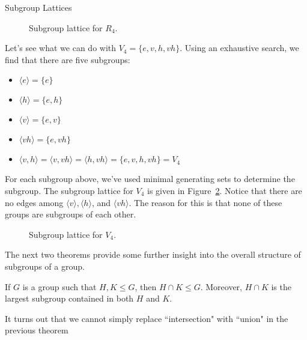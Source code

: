 \begin{section}{Subgroup Lattices}
\begin{figure}[!ht]
\caption{Subgroup lattice for $R_4$.}
\label{fig:latticeR4}
\end{figure}

Let's see what we can do with $V_4=\{e,v,h,vh\}$.  Using an exhaustive search, we find that there are five subgroups:
\begin{itemize}
\item[] $\langle e \rangle = \{e\}$
\item[] $\langle h \rangle  = \{e,h\}$
\item[] $\langle v \rangle  = \{e,v\}$
\item[] $\langle vh \rangle  = \{e,vh\}$
\item[] $\langle v,h \rangle = \langle v,vh\rangle = \langle h, vh\rangle= \{e,v,h,vh\}=V_4$
\end{itemize}
For each subgroup above, we've used minimal generating sets to determine the subgroup.  The subgroup lattice for $V_4$ is given in Figure~\ref{fig:latticeV4}. Notice that there are no edges among $\langle v\rangle, \langle h\rangle$, and $\langle vh\rangle$.  The reason for this is that none of these groups are subgroups of each other.

\begin{figure}[!ht]
\centering
{}
\caption{Subgroup lattice for $V_4$.}
\label{fig:latticeV4}
\end{figure}

The next two theorems provide some further insight into the overall structure of subgroups of a group.

\begin{theorem}\label{thm:subgroup_intersection}
If $G$ is a group such that $H,K\leq G$, then $H\cap K\leq G$. Moreover, $H\cap K$ is the largest subgroup contained in both $H$ and $K$.
\end{theorem}

It turns out that we cannot simply replace ``intersection" with ``union" in the previous theorem


\end{section}
